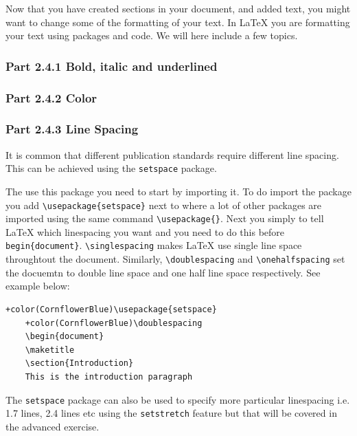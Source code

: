 \documentclass[12pts]{report}
\begin{document}
Now that you have created sections in your document, and added text, you might want to change some of the formatting of your text. In {\LaTeX} you are formatting your text using packages and code. We will here include a few topics.

\subsubsection*{Part 2.4.1 Bold, italic and underlined}

\subsubsection*{Part 2.4.2 Color}

\subsubsection*{Part 2.4.3 Line Spacing}
It is common that different publication standards require different line spacing. This can be achieved using the \texttt{setspace} package. 

The use this package you need to start by importing it. To do import the package you add \verb|\usepackage{setspace}| next to where a lot of other packages are imported using the same command \verb|\usepackage{}|. Next you simply to tell {\LaTeX} which linespacing you want and you need to do this before \verb|begin{document}|. \verb|\singlespacing| makes {\LaTeX} use single line space throughtout the document. Similarly, \verb|\doublespacing| and \verb|\onehalfspacing| set the docuemtn to double line space and one half line space respectively. See example below:

\begin{Verbatim}[commandchars=+\(\)]
	+color(CornflowerBlue)\usepackage{setspace}
	+color(CornflowerBlue)\doublespacing
	\begin{document}
	\maketitle
	\section{Introduction}
	This is the introduction paragraph
\end{Verbatim}

The \texttt{setspace} package can also be used to specify more particular linespacing i.e. 1.7 lines, 2.4 lines etc using the \texttt{setstretch} feature but that will be covered in the advanced exercise.
\end{document}
